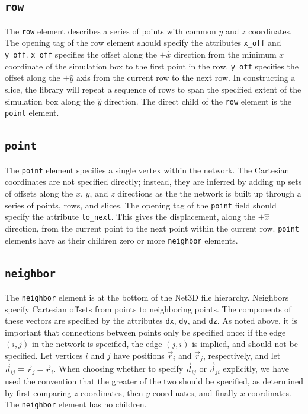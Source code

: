 \documentclass{article}
\begin{document}
\subsection{\texttt{row}}
The \texttt{row} element describes a series of points with common $y$ and $z$
coordinates. The opening tag of the row element should specify the attributes
\texttt{x\_off} and \texttt{y\_off}. \texttt{x\_off} specifies the offset along
the $+\hat{x}$ direction from the minimum $x$ coordinate of the simulation box
to the first point in the row. \texttt{y\_off} specifies the offset along the
$+\hat{y}$ axis from the current row to the next row. In constructing a slice,
the library will repeat a sequence of rows to span the specified extent of the
simulation box along the $\hat{y}$ direction. The direct child of the
\texttt{row} element is the \texttt{point} element.

\subsection{\texttt{point}}
The \texttt{point} element specifies a single vertex within the network. The
Cartesian coordinates are not specified directly; instead, they are inferred
by adding up sets of offsets along the $x$, $y$, and $z$ directions as the
the network is built up through a series of points, rows, and slices. The
opening tag of the \texttt{point} field should specify the attribute
\texttt{to\_next}. This gives the displacement, along the $+\hat{x}$ direction,
from the current point to the next point within the current row. \texttt{point}
elements have as their children zero or more \texttt{neighbor} elements.

\subsection{\texttt{neighbor}}
The \texttt{neighbor} element is at the bottom of the Net3D file hierarchy.
Neighbors specify Cartesian offsets from points to neighboring points. The
components of these vectors are specified by the attributes \texttt{dx},
\texttt{dy}, and \texttt{dz}. As noted above, it is important that connections
between points only be  specified once: if the edge $(i, j)$ in the network is
specified, the edge  $(j, i)$ is implied, and should not be specified. Let
vertices $i$ and $j$ have positions $\vec{r}_i$ and $\vec{r}_j$, respectively,
and let \mbox{$\vec{d}_{ij} \equiv \vec{r}_j - \vec{r}_i$}. When choosing
whether to specify $\vec{d}_{ij}$ or $\vec{d}_{ji}$ explicitly, we have used
the convention that the greater of the two should be specified, as determined
by first comparing $z$ coordinates, then $y$ coordinates, and finally $x$
coordinates. The \texttt{neighbor} element has no children.
\end{document}
